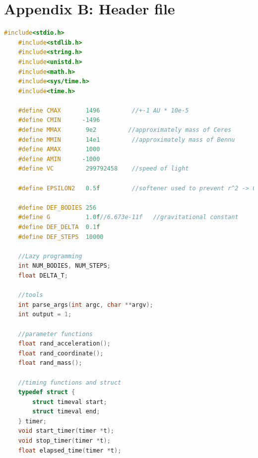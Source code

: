 \documentclass[10pt,a4paper]{article}
\begin{document}
	\section{Appendix B: Header file}
	\begin{lstlisting}[language=c]
	#include<stdio.h>
	#include<stdlib.h>
	#include<string.h>
	#include<unistd.h>
	#include<math.h>
	#include<sys/time.h>
	#include<time.h>
	
	#define CMAX       1496         //+-1 AU * 10e-5
	#define CMIN      -1496
	#define MMAX       9e2         //approximately mass of Ceres
	#define MMIN       14e1         //approximately mass of Bennu
	#define AMAX       1000
	#define AMIN      -1000
	#define VC         299792458    //speed of light
	
	#define EPSILON2   0.5f         //softener used to prevent r^2 -> 0
	
	#define DEF_BODIES 256
	#define G          1.0f//6.673e-11f   //gravitational constant
	#define DEF_DELTA  0.1f
	#define DEF_STEPS  10000
	
	//Lazy programming
	int NUM_BODIES, NUM_STEPS;
	float DELTA_T;
	
	//tools
	int parse_args(int argc, char **argv);
	int output = 1;
	
	//parameter functions
	float rand_acceleration();
	float rand_coordinate();
	float rand_mass();
	
	//timing functions and struct
	typedef struct {
		struct timeval start;
		struct timeval end;
	} timer;
	void start_timer(timer *t);
	void stop_timer(timer *t);
	float elapsed_time(timer *t);
	\end{lstlisting}
	
\end{document}
